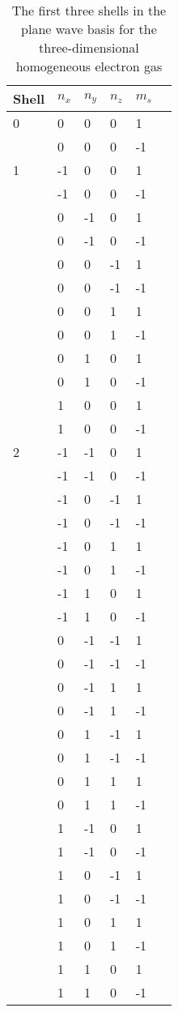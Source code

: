 \begin{table}[h]
\caption{The first three shells in the plane wave basis for the three-dimensional homogeneous electron gas}
\label{tab:3shell}
\begin{center}
\begin{threeparttable}
\begin{tabular}{l l l l l l}
    \toprule
Shell & $n_x$ & $n_y$ & $n_z$ & $m_s$ \\ \hline
0 & 0 & 0 & 0 & 1 & \\
 & 0 & 0 & 0 & -1 & \\ \hline
1 & -1 & 0 & 0 & 1 & \\
 & -1 & 0 & 0 & -1 & \\
 & 0 & -1 & 0 & 1 & \\
 & 0 & -1 & 0 & -1 & \\
 & 0 & 0 & -1 & 1 & \\
 & 0 & 0 & -1 & -1 & \\
 & 0 & 0 & 1 & 1 & \\
 & 0 & 0 & 1 & -1 & \\
 & 0 & 1 & 0 & 1 & \\
 & 0 & 1 & 0 & -1 & \\
 & 1 & 0 & 0 & 1 & \\
 & 1 & 0 & 0 & -1 & \\ \hline
2 & -1 & -1 & 0 & 1 & \\
 & -1 & -1 & 0 & -1 & \\
 & -1 & 0 & -1 & 1 & \\
 & -1 & 0 & -1 & -1 & \\
 & -1 & 0 & 1 & 1 & \\
 & -1 & 0 & 1 & -1 & \\
 & -1 & 1 & 0 & 1 & \\
 & -1 & 1 & 0 & -1 & \\
 & 0 & -1 & -1 & 1 & \\
 & 0 & -1 & -1 & -1 & \\
 & 0 & -1 & 1 & 1 & \\
 & 0 & -1 & 1 & -1 & \\
 & 0 & 1 & -1 & 1 & \\
 & 0 & 1 & -1 & -1 & \\
 & 0 & 1 & 1 & 1 & \\
 & 0 & 1 & 1 & -1 & \\
 & 1 & -1 & 0 & 1 & \\
 & 1 & -1 & 0 & -1 & \\
 & 1 & 0 & -1 & 1 & \\
 & 1 & 0 & -1 & -1 & \\
 & 1 & 0 & 1 & 1 & \\
 & 1 & 0 & 1 & -1 & \\
 & 1 & 1 & 0 & 1 & \\
 & 1 & 1 & 0 & -1 & \\
\bottomrule
\end{tabular}
\begin{tablenotes}
\end{tablenotes}
\end{threeparttable}
\end{center}
\end{table}

